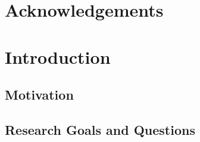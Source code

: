 \documentclass[11pt,a4paper,oneside]{report}
\newcommand{\labelscalar}{y}              %
\begin{document}
%
%

\chapter*{Acknowledgements}


\tableofcontents

\chapter{Introduction}
\label{ch:intro}


\section{Motivation}

\section{Research Goals and Questions}
\label{sec:goals}
%
\end{document}
